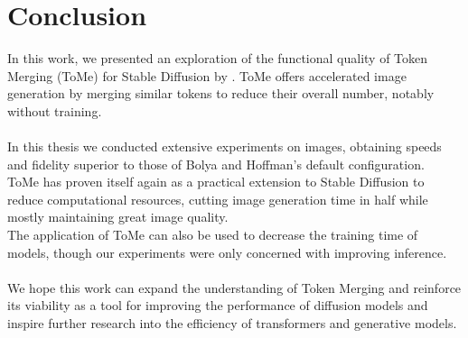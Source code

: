 \section{Conclusion}
In this work, we presented an exploration of the functional quality of Token Merging (ToMe) for Stable Diffusion by \cite{bolya2023tomesd}. ToMe offers accelerated image generation by merging similar tokens to reduce their overall number, notably without training.\\
\\
In this thesis we conducted extensive experiments on images, obtaining speeds and fidelity superior to those of Bolya and Hoffman's default configuration.\\
ToMe has proven itself again as a practical extension to Stable Diffusion to reduce computational resources, cutting image generation time in half while mostly maintaining great image quality.\\
The application of ToMe can also be used to decrease the training time of models, though our experiments were only concerned with improving inference.\\
\\
We hope this work can expand the understanding of Token Merging and reinforce its viability as a tool for improving the performance of diffusion models and inspire further research into the efficiency of transformers and generative models.\\



